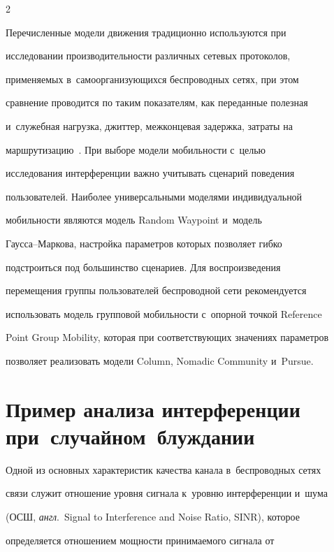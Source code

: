 \begin{multicols}{2}
\begin{figure}
\end{figure}



  Перечисленные модели движения традиционно используются при 

исследовании про\-из\-во\-ди\-тель\-ности различных сетевых протоколов, 

при\-ме\-ня\-емых в~са\-мо\-ор\-га\-низу\-ющих\-ся беспроводных сетях, при этом 

сравнение проводится по таким показателям, как переданные полезная 

и~служебная на\-груз\-ка, джиттер, межконцевая за\-держ\-ка, за\-тра\-ты на 

маршрутизацию~\cite{11-sg}. При выборе модели мо\-биль\-ности с~целью 

исследования интерференции важно учитывать сценарий поведения 

пользователей. Наиболее универсальными моделями индивидуальной 

мо\-биль\-ности являются модель Random Waypoint и~модель  

Гаус\-са--Мар\-ко\-ва, настройка па\-ра\-мет\-ров которых позволяет гиб\-ко 

под\-стро\-ить\-ся под большинство сценариев. Для воспроизведения 

перемещения группы пользователей беспроводной сети рекомендуется 

использовать модель групповой мо\-биль\-ности с~опорной точ\-кой Reference 

Point Group Mobility, которая при со\-от\-вет\-ст\-ву\-ющих значениях па\-ра\-мет\-ров 

позволяет реализовать модели Column, Nomadic Community и~Pursue. 



\section{Пример анализа интерференции при~случайном~блуждании} 

  

  Одной из основных характеристик качества канала в~беспроводных сетях 

связи служит отношение уров\-ня сигнала к~уров\-ню интерференции и~шума 

(ОСШ, \textit{англ}.\ Signal to Interference and Noise Ratio, SINR), которое 

определяется отношением мощ\-ности принимаемого сигнала от 


\end{multicols}
